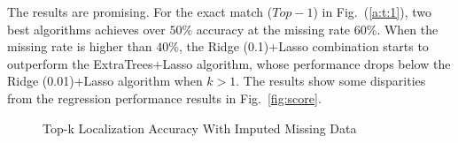   The results are promising. For the exact match ($Top-1$) in Fig.~(\ref{a:t:1}), two best algorithms achieves over 
  $50\%$ accuracy at the missing rate $60\%$. When the missing rate is higher than $40\%$, the Ridge (0.1)+Lasso combination starts to outperform the ExtraTrees+Lasso algorithm, whose performance drops below the Ridge (0.01)+Lasso algorithm when $k>1$. The results show some disparities from the regression performance results in Fig.~\ref{fig:score}. 
   
    \begin{figure}[!ht]
    \hfill
    \hfill
    \hfill
    
    \caption{Top-k Localization Accuracy With Imputed Missing Data}
    \label{fig:topk}
  \end{figure}
  
  
  